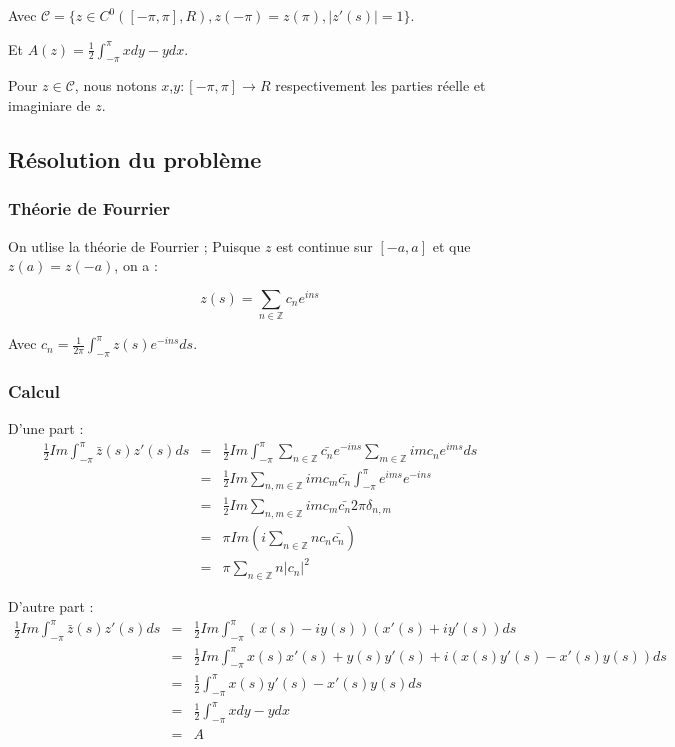 \documentclass[10pt,a4paper]{article}
\newcommand{\Z}{\mathbb{Z}}
\theoremstyle{plain}
\theoremstyle{definition}
\begin{document}
Avec $\mathcal{C} = \{ z \in C^0([-\pi,\pi], R), z(-\pi)=z(\pi), |z'(s)|=1 \}$.

Et $A(z) = \frac{1}{2} \int_{-\pi}^{\pi}{xdy-ydx}$.


Pour $z\in \mathcal{C}$, nous notons $x$,$y : [-\pi,\pi] \rightarrow R$ respectivement les parties réelle et imaginiare de $z$.

\subsection[Résolution du problème]{Résolution du problème \cite{fuglede86}}



\subsubsection{Théorie de Fourrier}

On utlise la théorie de Fourrier ; Puisque $z$ est continue sur $[-a,a]$ et que $z(a)=z(-a)$, on a :

\[ z(s) = \sum_{n \in \Z}{c_n e^{ins}} \]

Avec $c_n = \frac{1}{2\pi} \int_{-\pi}^{\pi}{z(s)e^{-ins}ds}$.

\subsubsection{Calcul}

D'une part :
\begin{eqnarray*}
\frac{1}{2} Im \int_{-\pi}^{\pi}{\bar{z}(s) z'(s) ds} &=& \frac{1}{2} Im \int_{-\pi}^{\pi}{ \sum_{n\in \Z}{\bar{c_n} e^{-ins}} \sum_{m\in \Z}{imc_n e^{ims}} ds}\\
&=& \frac{1}{2} Im \sum_{n,m\in \Z}{ im c_m \bar{c_n} \int_{-\pi}^{\pi}{e^{ims}e^{-ins}} } \\
&=& \frac{1}{2} Im \sum_{n,m\in \Z}{ im c_m \bar{c_n} 2\pi \delta_{n,m} } \\
&=& \pi Im( i\sum_{n\in \Z}{ n c_n \bar{c_n}}) \\
&=& \pi \sum_{n\in \Z}{ n |c_n|^2}
\end{eqnarray*}

D'autre part :
\begin{eqnarray*}
\frac{1}{2} Im \int_{-\pi}^{\pi}{\bar{z}(s) z'(s) ds} &=& \frac{1}{2} Im \int_{-\pi}^{\pi}{(x(s)-iy(s)) (x'(s)+iy'(s)) ds} \\
&=& \frac{1}{2} Im \int_{-\pi}^{\pi}{x(s)x'(s)+y(s)y'(s) + i(x(s)y'(s)-x'(s)y(s)) ds} \\
&=& \frac{1}{2} \int_{-\pi}^{\pi}{x(s)y'(s)-x'(s)y(s) ds} \\
&=& \frac{1}{2} \int_{-\pi}^{\pi}{xdy-ydx} \\
&=& A
\end{eqnarray*}
\end{document}
